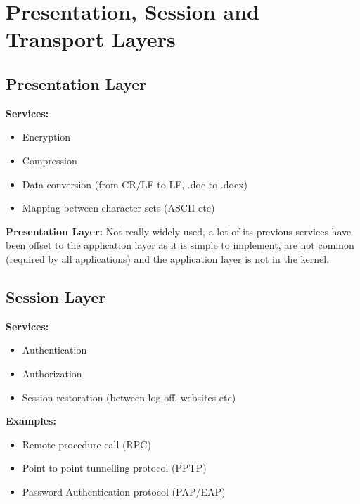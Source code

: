 \documentclass[a4paper,10pt]{article}
\begin{document}
\section{Presentation, Session and Transport Layers}
\subsection{Presentation Layer}
\textcolor{PineGreen}{\textbf{Services:}}
\begin{itemize}
	\item Encryption 
	\item Compression 
	\item Data conversion (from CR/LF to LF, .doc to .docx)
	\item Mapping between character sets (ASCII etc)
\end{itemize}
\textcolor{PineGreen}{\textbf{Presentation Layer:}} Not really widely used, a lot of its previous services have been offset to the application layer as it is simple to implement, are not common (required by all applications) and the application layer is not in the kernel.
\subsection{Session Layer}
\textcolor{PineGreen}{\textbf{Services:}} 
\begin{itemize}
	\item Authentication
	\item Authorization 
	\item Session restoration (between log off, websites etc)
\end{itemize}
\textcolor{PineGreen}{\textbf{Examples:}}
\begin{itemize}
	\item Remote procedure call (RPC)
	\item Point to point tunnelling protocol (PPTP)
	\item Password Authentication protocol (PAP/EAP)
\end{itemize}
\end{document}
